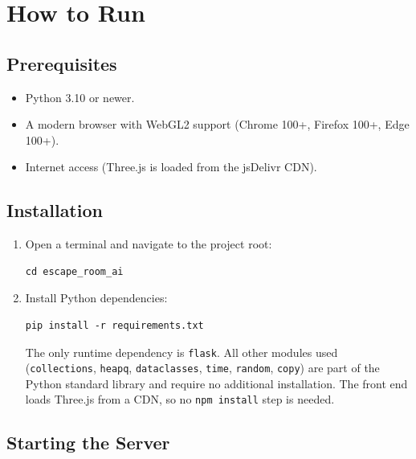 \documentclass[12pt, a4paper]{report}
\begin{document}
\appendix
\chapter{How to Run}
\label{app:run}

\section{Prerequisites}

\begin{itemize}[leftmargin=1.5em]
  \item Python 3.10 or newer.
  \item A modern browser with WebGL2 support
        (Chrome 100+, Firefox 100+, Edge 100+).
  \item Internet access (Three.js is loaded from the jsDelivr CDN).
\end{itemize}

\section{Installation}

\begin{enumerate}[leftmargin=1.5em]
  \item Open a terminal and navigate to the project root:
\begin{verbatim}
cd escape_room_ai
\end{verbatim}
  \item Install Python dependencies:
\begin{verbatim}
pip install -r requirements.txt
\end{verbatim}
  The only runtime dependency is \texttt{flask}.  All other modules used (\texttt{collections}, \texttt{heapq}, \texttt{dataclasses}, \texttt{time}, \texttt{random}, \texttt{copy}) are part of the Python standard library and require no additional installation.  The front end loads Three.js from a CDN, so no \texttt{npm install} step is needed.
\end{enumerate}

\section{Starting the Server}
\end{document}
